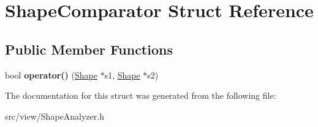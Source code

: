 \hypertarget{struct_shape_comparator}{}\section{Shape\+Comparator Struct Reference}
\label{struct_shape_comparator}
\subsection*{Public Member Functions}
\begin{DoxyCompactItemize}
\item 
\hypertarget{struct_shape_comparator_a08b1b8a1a6b065703795aa111b2efc4e}{}bool {\bfseries operator()} (\hyperlink{class_shape}{Shape} $\ast$s1, \hyperlink{class_shape}{Shape} $\ast$s2)\label{struct_shape_comparator_a08b1b8a1a6b065703795aa111b2efc4e}

\end{DoxyCompactItemize}


The documentation for this struct was generated from the following file\+:\begin{DoxyCompactItemize}
\item 
src/view/Shape\+Analyzer.\+h\end{DoxyCompactItemize}
